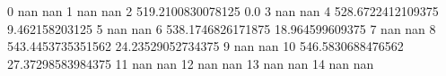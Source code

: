 0 nan nan
1 nan nan
2 519.2100830078125 0.0
3 nan nan
4 528.6722412109375 9.462158203125
5 nan nan
6 538.1746826171875 18.964599609375
7 nan nan
8 543.4453735351562 24.23529052734375
9 nan nan
10 546.5830688476562 27.37298583984375
11 nan nan
12 nan nan
13 nan nan
14 nan nan
